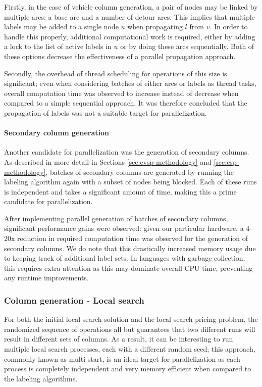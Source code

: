 \documentclass[]{article}
\begin{document}
Firstly, in the case of vehicle column generation, a pair of nodes may be linked by multiple arcs: a base arc and a number of detour arcs. This implies that multiple labels may be added to a single node $u$ when propagating $l$ from $v$. In order to handle this properly, additional computational work is required, either by adding a lock to the list of active labels in $u$ or by doing these arcs sequentially. Both of these options decrease the effectiveness of a parallel propagation approach. 

Secondly, the overhead of thread scheduling for operations of this size is significant; even when considering batches of either arcs or labels as thread tasks, overall computation time was observed to increase instead of decrease when compared to a simple sequential approach. It was therefore concluded that the propagation of labels was not a suitable target for parallelization.

\paragraph{Secondary column generation}
Another candidate for parallelization was the generation of secondary columns. As described in more detail in Sections \ref{sec:evsp-methodology} and \ref{sec:csp-methodology}, batches of secondary columns are generated by running the labeling algorithm again with a subset of nodes being blocked. Each of these runs is independent and takes a significant amount of time, making this a prime candidate for parallelization.

After implementing parallel generation of batches of secondary columns, significant performance gains were observed: given our particular hardware, a 4-20x reduction in required computation time was observed for the generation of secondary columns. We do note that this drastically increased memory usage due to keeping track of additional label sets. In languages with garbage collection, this requires extra attention as this may dominate overall CPU time, preventing any runtime improvements.

\subsubsection{Column generation - Local search}
For both the initial local search solution and the local search pricing problem, the randomized sequence of operations all but guarantees that two different runs will result in different sets of columns. As a result, it can be interesting to run multiple local search processes, each with a different random seed; this approach, commonly known as multi-start, is an ideal target for parallelization as each process is completely independent and very memory efficient when compared to the labeling algorithms. 
\end{document}
